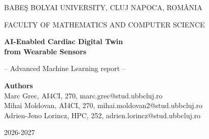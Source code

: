 \documentclass[runningheads,a4paper,11pt]{report}
\newcommand{\memberA}{Marc Grec}
\newcommand{\memberB}{Mihai Moldovan}
\newcommand{\memberC}{Adrien-Jeno Lorincz}
\begin{document}
\begin{titlepage}
\sloppy

\begin{center}
BABE\c S BOLYAI UNIVERSITY, CLUJ NAPOCA, ROM\^ ANIA

FACULTY OF MATHEMATICS AND COMPUTER SCIENCE

\vspace{5cm}

\Huge \textbf{AI-Enabled Cardiac Digital Twin\\from Wearable Sensors}

\vspace{1cm}

\normalsize -- Advanced Machine Learning report --

\end{center}


\vspace{4cm}

\begin{flushright}
\Large{\textbf{Authors}}\\
\normalsize
\memberA, AI4CI, 270, marc.grec@stud.ubbcluj.ro\\
\memberB, AI4CI, 270, mihai.moldovan2@stud.ubbcluj.ro\\
\memberC, HPC, 252, adrien.lorincz@stud.ubbcluj.ro
\end{flushright}

\vspace{3cm}

\begin{center}
2026-2027
\end{center}

\end{titlepage}






\tableofcontents


\newpage












{\small{}}
\end{document}
